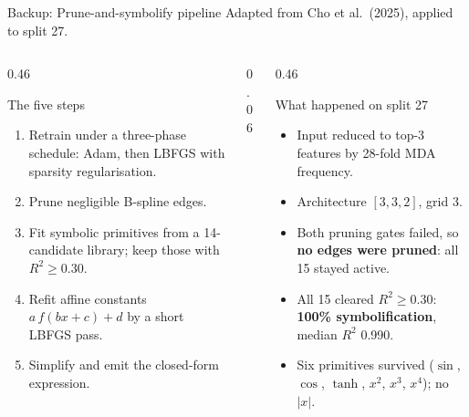 \documentclass[aspectratio=169, t]{beamer}
\begin{document}

\begin{frame}{Backup: Prune-and-symbolify pipeline}
\vspace{-0.5em}
\centering
{\footnotesize Adapted from Cho et al.\ (2025), applied to split 27.}
\vspace{0.5em}

\begin{columns}[T]
\begin{column}{0.46\textwidth}
{
\begin{block}{The five steps}
\scriptsize
\begin{enumerate}\setlength{\itemsep}{2pt}
  \item Retrain under a three-phase schedule: Adam, then LBFGS with sparsity regularisation.
  \item Prune negligible B-spline edges.
  \item Fit symbolic primitives from a 14-candidate library; keep those with $R^2 \geq 0.30$.
  \item Refit affine constants $a\,f(bx+c)+d$ by a short LBFGS pass.
  \item Simplify and emit the closed-form expression.
\end{enumerate}
\end{block}
}
\end{column}
\begin{column}{0.06\textwidth}\hfill\end{column}
\begin{column}{0.46\textwidth}
{
\begin{block}{What happened on split 27}
\scriptsize
\begin{itemize}\setlength{\itemsep}{2pt}
  \item Input reduced to top-3 features by 28-fold MDA frequency.
  \item Architecture $[3,3,2]$, grid 3.
  \item Both pruning gates failed, so \textbf{no edges were pruned}: all 15 stayed active.
  \item All 15 cleared $R^2 \geq 0.30$: \textbf{100\% symbolification}, median $R^2$ 0.990.
  \item Six primitives survived ($\sin$, $\cos$, $\tanh$, $x^2$, $x^3$, $x^4$); no $|x|$.
\end{itemize}
\end{block}
}
\end{column}
\end{columns}


\end{frame}
\end{document}
